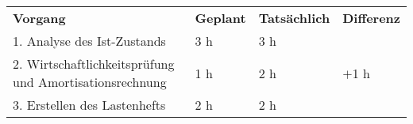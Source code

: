 \begin{tabularx}{\textwidth}{Xlll}
\rowcolor{heading}\textbf{Vorgang} & \textbf{Geplant} & \textbf{Tatsächlich} & \textbf{Differenz} \\
1. Analyse des Ist-Zustands & 3 h   & 3 h   &  \\
\rowcolor{odd}2. Wirtschaftlichkeitsprüfung und Amortisationsrechnung & 1 h   & 2 h   & $+$1 h\\
3. Erstellen des Lastenhefts & 2 h   & 2 h   &  \\
\end{tabularx}